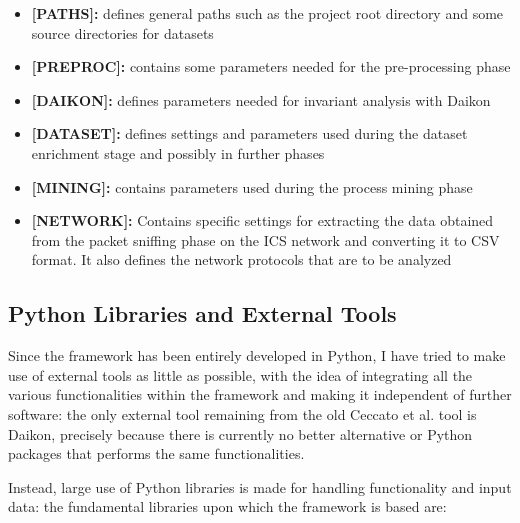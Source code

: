 \begin{itemize}
	\item \textbf{[PATHS]:} defines general paths such as the project root directory and some source directories for datasets
	
	\item \textbf{[PREPROC]:} contains some parameters needed for the pre-processing phase
	
	\item \textbf{[DAIKON]:} defines parameters needed for invariant analysis with Daikon
	
	\item \textbf{[DATASET]:} defines settings and parameters used during the dataset enrichment stage and possibly in further phases
	
	\item \textbf{[MINING]:} contains parameters used during the process mining phase
	
	\item \textbf{[NETWORK]:} Contains specific settings for extracting the data obtained from the packet sniffing phase on the ICS network and converting it to CSV format. It also defines the network protocols that are to be analyzed
\end{itemize}

\subsection{Python Libraries and External Tools}
\label{subsec:tools_libraries}
Since the framework has been entirely developed in Python, I have tried to make use of external tools as little as possible, with the idea of integrating all the various functionalities within the framework and making it independent of further software: the only external tool remaining from the old Ceccato et al. tool is Daikon, precisely because there is currently no better alternative or Python packages that performs the same functionalities.

\bigskip
Instead, large use of Python libraries is made for handling functionality and input data: the fundamental libraries upon which the framework is based are:

